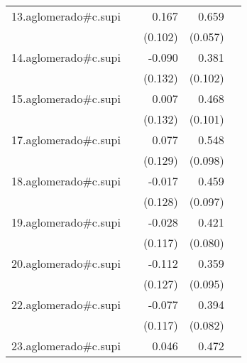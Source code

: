 {\begin{longtable}{l*{4}{D{.}{.}{-1}}}
\addlinespace
13.aglomerado#c.supi&                     &       0.167         &       0.659\sym{***}&                     \\
            &                     &     (0.102)         &     (0.057)         &                     \\
\addlinespace
14.aglomerado#c.supi&                     &      -0.090         &       0.381\sym{***}&                     \\
            &                     &     (0.132)         &     (0.102)         &                     \\
\addlinespace
15.aglomerado#c.supi&                     &       0.007         &       0.468\sym{***}&                     \\
            &                     &     (0.132)         &     (0.101)         &                     \\
\addlinespace
17.aglomerado#c.supi&                     &       0.077         &       0.548\sym{***}&                     \\
            &                     &     (0.129)         &     (0.098)         &                     \\
\addlinespace
18.aglomerado#c.supi&                     &      -0.017         &       0.459\sym{***}&                     \\
            &                     &     (0.128)         &     (0.097)         &                     \\
\addlinespace
19.aglomerado#c.supi&                     &      -0.028         &       0.421\sym{***}&                     \\
            &                     &     (0.117)         &     (0.080)         &                     \\
\addlinespace
20.aglomerado#c.supi&                     &      -0.112         &       0.359\sym{***}&                     \\
            &                     &     (0.127)         &     (0.095)         &                     \\
\addlinespace
22.aglomerado#c.supi&                     &      -0.077         &       0.394\sym{***}&                     \\
            &                     &     (0.117)         &     (0.082)         &                     \\
\addlinespace
23.aglomerado#c.supi&                     &       0.046         &       0.472\sym{***}&                     \\

\end{longtable}}

